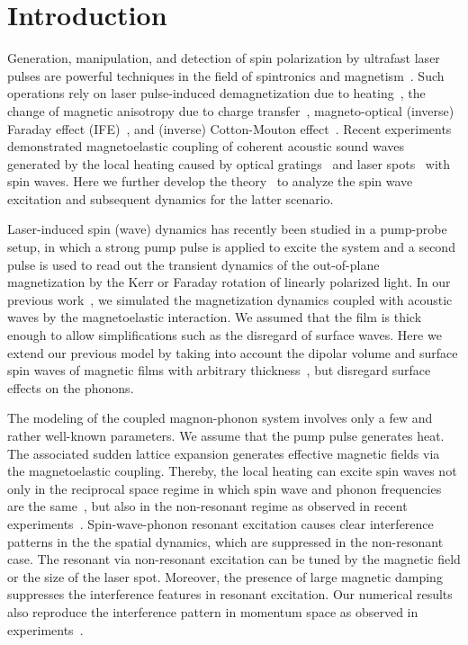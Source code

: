 \documentclass[aps,prb,twocolumn,superscriptaddress,floatfix]{revtex4}%
\begin{document}
\section{Introduction}
Generation, manipulation, and detection of spin polarization by ultrafast laser pulses are powerful techniques in the field of spintronics and magnetism~\cite{Ju99,Kampen02,Vahaplar09,Kirilyuk10,Barker13}. Such operations rely on laser pulse-induced demagnetization due to heating~\cite{Beaurepaire96}, the change of magnetic anisotropy due to charge transfer~\cite{Ju99,Kampen02}, magneto-optical (inverse) Faraday effect (IFE)~\cite{Kimel05,Hansteen05,Satoh12}, and (inverse) Cotton-Mouton effect~\cite{BenAmer11}. Recent experiments demonstrated magnetoelastic coupling of coherent acoustic sound waves generated by the local heating caused by optical gratings~\cite{Janusonis16,Chang17} and laser spots~\cite{Au13, Ogawa15,Shen15,Hashimoto17} with spin waves. Here we further develop the theory~\cite{Shen15} to analyze the spin wave excitation and  subsequent dynamics for the latter scenario.

Laser-induced spin (wave) dynamics has recently been studied in a pump-probe setup, in which a strong pump pulse is applied to excite the system and a second pulse is used to read out the transient dynamics of the out-of-plane magnetization by the Kerr or Faraday rotation of linearly polarized light. In our previous work~\cite{Shen15}, we simulated the magnetization dynamics coupled with acoustic waves by the magnetoelastic interaction. We assumed that the film is thick enough to allow simplifications such as the disregard of surface waves. Here we extend our previous model by taking into account the dipolar volume and surface spin waves of magnetic films with arbitrary thickness~\cite{Damon1961}, but disregard surface effects on the phonons. 

The modeling of the coupled magnon-phonon system involves only a few and rather well-known parameters. We assume that the pump pulse generates heat. The associated sudden lattice expansion generates effective magnetic fields via the magnetoelastic coupling. Thereby, the local heating can excite spin waves not only in the reciprocal space regime in which spin wave and phonon frequencies are the same~\cite{Ogawa15,Shen15,Janusonis16,Kikkawa_polaron,Benedetta_polaron}, but also in the non-resonant regime as observed in recent experiments~\cite{Hashimoto17}. Spin-wave-phonon resonant excitation causes clear interference patterns in the the spatial dynamics, which are suppressed in the non-resonant case. The resonant via non-resonant excitation can be tuned by the magnetic field or the size of the laser spot. Moreover, the presence of large magnetic damping suppresses the interference features in resonant excitation. Our numerical results also reproduce the interference pattern in momentum space as observed in experiments~\cite{Hashimoto17}.
\end{document}
